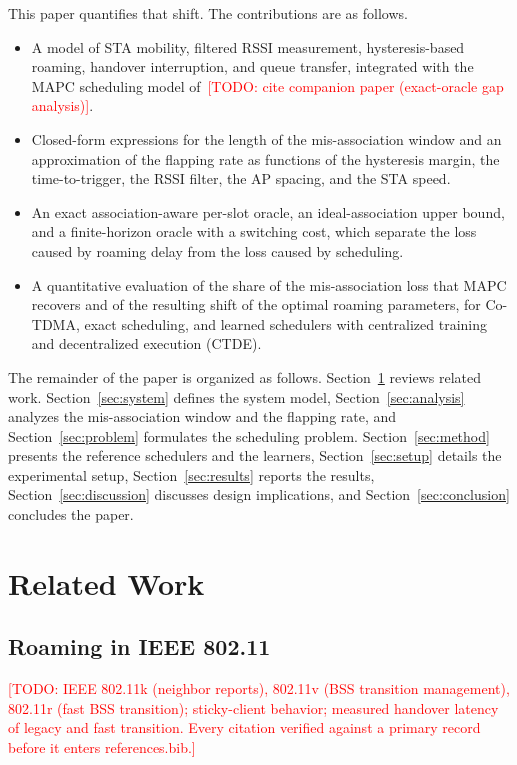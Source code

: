 \documentclass{ieeeaccess}
\newcommand{\todo}[1]{\textcolor{red}{[TODO: #1]}}
\begin{document}
This paper quantifies that shift. The contributions are as follows.
\begin{itemize}
\item A model of STA mobility, filtered RSSI measurement, hysteresis-based roaming, handover interruption, and queue transfer, integrated with the MAPC scheduling model of~\todo{cite companion paper (exact-oracle gap analysis)}.
\item Closed-form expressions for the length of the mis-association window and an approximation of the flapping rate as functions of the hysteresis margin, the time-to-trigger, the RSSI filter, the AP spacing, and the STA speed.
\item An exact association-aware per-slot oracle, an ideal-association upper bound, and a finite-horizon oracle with a switching cost, which separate the loss caused by roaming delay from the loss caused by scheduling.
\item A quantitative evaluation of the share of the mis-association loss that MAPC recovers and of the resulting shift of the optimal roaming parameters, for Co-TDMA, exact scheduling, and learned schedulers with centralized training and decentralized execution (CTDE).
\end{itemize}

The remainder of the paper is organized as follows. Section~\ref{sec:related} reviews related work. Section~\ref{sec:system} defines the system model, Section~\ref{sec:analysis} analyzes the mis-association window and the flapping rate, and Section~\ref{sec:problem} formulates the scheduling problem. Section~\ref{sec:method} presents the reference schedulers and the learners, Section~\ref{sec:setup} details the experimental setup, Section~\ref{sec:results} reports the results, Section~\ref{sec:discussion} discusses design implications, and Section~\ref{sec:conclusion} concludes the paper.

\section{Related Work}
\label{sec:related}
\subsection{Roaming in IEEE 802.11}
\todo{IEEE 802.11k (neighbor reports), 802.11v (BSS transition management), 802.11r (fast BSS transition); sticky-client behavior; measured handover latency of legacy and fast transition. Every citation verified against a primary record before it enters references.bib.}
\end{document}
